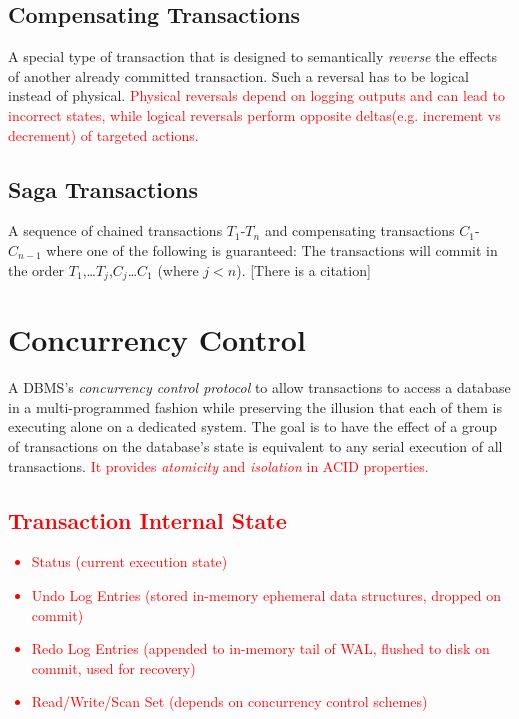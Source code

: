 \documentclass[11pt]{article}
\newcommand{\rr}[1]{\textcolor{red}{#1}}
\begin{document}
\subsection*{Compensating Transactions}
A special type of transaction that is designed to semantically \textit{reverse} the effects of 
another already committed transaction. Such a reversal has to be logical instead of physical. \rr{Physical reversals depend on logging outputs and can lead to incorrect states, while logical reversals perform opposite deltas(e.g. increment vs decrement) of targeted actions.}

\subsection*{Saga Transactions}
A sequence of chained transactions $T_1$-$T_n$ and compensating transactions $C_1$-$C_{n-1}$ where 
one of the following is guaranteed: The transactions will commit in the order 
$T_1$,\dots$T_j$,$C_j$\dots$C_1$ (where $j<n$). [There is a citation]

\section{Concurrency Control}
A DBMS's \textit{concurrency control protocol} to allow transactions to access a database in a 
multi-programmed fashion while preserving the illusion that each of them is executing alone on a 
dedicated system. The goal is to have the effect of a group of transactions on the database's state 
is equivalent to any serial execution of all transactions. \rr{It provides \textit{atomicity} and \textit{isolation} in ACID properties.}

\rr{\subsection*{Transaction Internal State}
\begin{itemize}
    \item Status (current execution state)
    \item Undo Log Entries (stored in-memory ephemeral data structures, dropped on commit)
    \item Redo Log Entries (appended to in-memory tail of WAL, flushed to disk on commit, used for recovery)
    \item Read/Write/Scan Set (depends on concurrency control schemes)
\end{itemize}}
    
\end{document}
